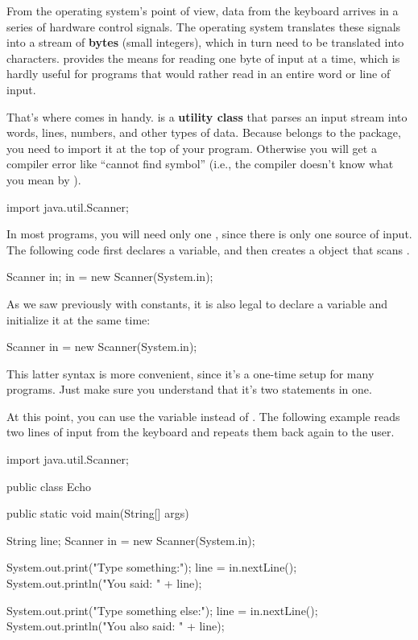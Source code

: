 
From the operating system's point of view, data from the keyboard arrives in a series of hardware control signals.
The operating system translates these signals into a stream of \textbf{bytes} (small integers), which in turn need to be translated into characters.
 provides the means for reading one byte of input at a time, which is hardly useful for programs that would rather read in an entire word or line of input.


That's where  comes in handy.
 is a {\bf utility class} that parses an input stream into words, lines, numbers, and other types of data.
Because  belongs to the  package, you need to import it at the top of your program.
Otherwise you will get a compiler error like ``cannot find symbol'' (i.e., the compiler doesn't know what you mean by ).

\begin{code}
import java.util.Scanner;
\end{code}

In most programs, you will need only one , since there is only one source of input.
The following code first declares a  variable, and then creates a  object that scans .

\begin{code}
    Scanner in;
    in = new Scanner(System.in);
\end{code}


As we saw previously with constants, it is also legal to declare a variable and initialize it at the same time:

\begin{code}
    Scanner in = new Scanner(System.in);
\end{code}

This latter syntax is more convenient, since it's a one-time setup for many programs.
Just make sure you understand that it's two statements in one.

At this point, you can use the variable  instead of .
The following example reads two lines of input from the keyboard and repeats them back again to the user.

\begin{code}
import java.util.Scanner;

public class Echo {

    public static void main(String[] args) {
        String line;
        Scanner in = new Scanner(System.in);

        System.out.print("Type something:");
        line = in.nextLine();
        System.out.println("You said: " + line);

        System.out.print("Type something else:");
        line = in.nextLine();
        System.out.println("You also said: " + line);
    }

}
\end{code}


